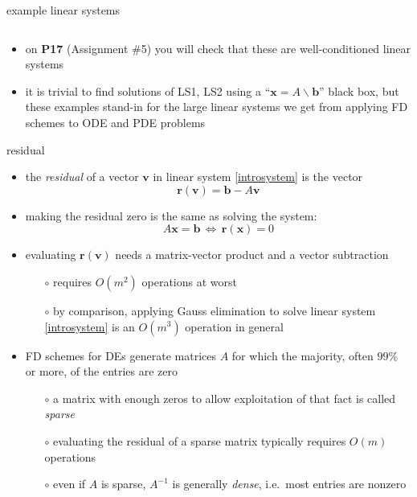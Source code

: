\documentclass[10pt,hyperref]{beamer}
\newcommand{\bb}{\mathbf{b}}
\newcommand{\br}{\mathbf{r}}
\newcommand{\bx}{\mathbf{x}}
\newcommand{\bv}{\mathbf{v}}
\begin{document}
\begin{frame}{example linear systems}
\begin{itemize}
\begin{itemize}
\begin{equation*}
\end{equation*}
  \end{itemize}
\item on \textbf{P17} (Assignment \#5) you will check that these are well-conditioned linear systems
\item it is trivial to find solutions of LS1, LS2 using a ``$\bx = A\backslash \bb$'' black box, but these examples stand-in for the large linear systems we get from applying FD schemes to ODE and PDE problems
\end{itemize}
\end{frame}


\begin{frame}{residual}

\begin{itemize}
\item the \emph{residual} of a vector $\bv$ in linear system \eqref{introsystem} is the vector
\begin{equation}
\br(\bv) = \bb - A \bv \label{residualdefn}
\end{equation}
\item making the residual zero is the same as solving the system:
      $$A \bx=\bb \, \iff \, \br(\bx)=0$$
\item evaluating $\br(\bv)$ needs a matrix-vector product and a vector subtraction
  \begin{itemize}
  \item[$\circ$] requires $O(m^2)$ operations at worst
  \item[$\circ$] by comparison, applying Gauss elimination to solve linear system \eqref{introsystem} is an $O(m^3)$ operation in general
  \end{itemize}
\item FD schemes for DEs generate matrices $A$ for which the majority, often $99\%$ or more, of the entries are zero
  \begin{itemize}
  \item[$\circ$] a matrix with enough zeros to allow exploitation of that fact is called \emph{sparse}
  \item[$\circ$] evaluating the residual of a sparse matrix typically requires $O(m)$ operations
  \item[$\circ$] even if $A$ is sparse, $A^{-1}$ is generally \emph{dense}, i.e.~most entries are nonzero
  \end{itemize}
\end{itemize}
\end{frame}
\end{document}
